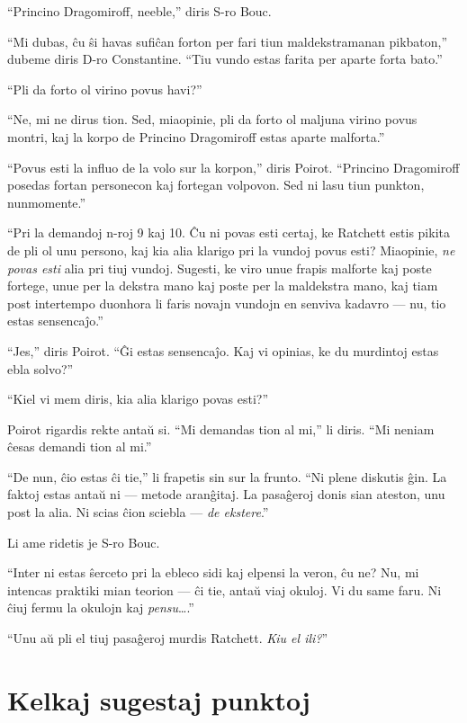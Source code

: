``Princino Dragomiroff, neeble,'' diris S-ro Bouc.

``Mi dubas, ĉu ŝi havas sufiĉan forton per fari tiun maldekstramanan pikbaton,'' dubeme diris D-ro Constantine. ``Tiu vundo estas farita per aparte forta bato.''

``Pli da forto ol virino povus havi?''

``Ne, mi ne dirus tion. Sed, miaopinie, pli da forto ol maljuna virino povus montri, kaj la korpo de Princino Dragomiroff estas aparte malforta.''

``Povus esti la influo de la volo sur la korpon,'' diris Poirot. ``Princino Dragomiroff posedas fortan personecon kaj fortegan volpovon. Sed ni lasu tiun punkton, nunmomente.''

``Pri la demandoj n-roj 9 kaj 10. Ĉu ni povas esti certaj, ke Ratchett estis pikita de pli ol unu persono, kaj kia alia klarigo pri la vundoj povus esti? Miaopinie, \emph{ne povas esti} alia pri tiuj vundoj. Sugesti, ke viro unue frapis malforte kaj poste fortege, unue per la dekstra mano kaj poste per la maldekstra mano, kaj tiam post intertempo duonhora li faris novajn vundojn en senviva kadavro --- nu, tio estas sensencaĵo.''

``Jes,'' diris Poirot. ``Ĝi estas sensencaĵo. Kaj vi opinias, ke du murdintoj estas ebla solvo?''

``Kiel vi mem diris, kia alia klarigo povas esti?''

Poirot rigardis rekte antaŭ si. ``Mi demandas tion al mi,'' li diris. ``Mi neniam ĉesas demandi tion al mi.''

``De nun, ĉio estas ĉi tie,'' li frapetis sin sur la frunto. ``Ni plene diskutis ĝin. La faktoj estas antaŭ ni --- metode aranĝitaj. La pasaĝeroj donis sian ateston, unu post la alia. Ni scias ĉion sciebla --- \emph{de ekstere}.''

Li ame ridetis je S-ro Bouc.

``Inter ni estas ŝerceto pri la ebleco sidi kaj elpensi la veron, ĉu ne? Nu, mi intencas praktiki mian teorion --- ĉi tie, antaŭ viaj okuloj. Vi du same faru. Ni ĉiuj fermu la okulojn kaj \emph{pensu}{\ldots}.''

``Unu aŭ pli el tiuj pasaĝeroj murdis Ratchett. \emph{Kiu el ili?}''

\chapter[Kelkaj sugestaj punktoj]{Kelkaj sugestaj punktoj}


